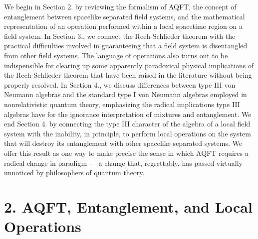 \documentclass[12pt]{article}
\begin{document}
We begin in Section 2. by reviewing the formalism of 
AQFT, the concept of entanglement between spacelike separated field 
systems, and the mathematical representation of an operation 
performed within a local spacetime region on a field system.  In Section 
3., 
we connect the Reeh-Schlieder theorem with the practical difficulties 
involved in guaranteeing that a field system is disentangled from 
other field systems.  The language of operations also 
turns out to be indispensible for clearing up some apparently 
paradoxical physical implications of 
the Reeh-Schlieder theorem that have been raised in the literature 
without being properly resolved.  
In Section 4., we discuss differences
between type III von Neumann algebras and the standard type I von 
Neumann algebras employed in nonrelativistic quantum theory, 
emphasizing the radical implications type III algebras 
have for the ignorance interpretation 
of mixtures and entanglement.  We end Section 4. by 
connecting the type III character of the 
algebra of a local field system with the inability, in principle, to 
perform local operations on the system that will destroy its entanglement 
with other spacelike separated systems.  We offer this result as one 
way to make precise the sense in which AQFT requires a radical change 
in paradigm --- a change that, regrettably, has passed virtually
unnoticed by philosophers of quantum theory. 

\section*{2. AQFT, Entanglement, and Local Operations}
\end{document}
